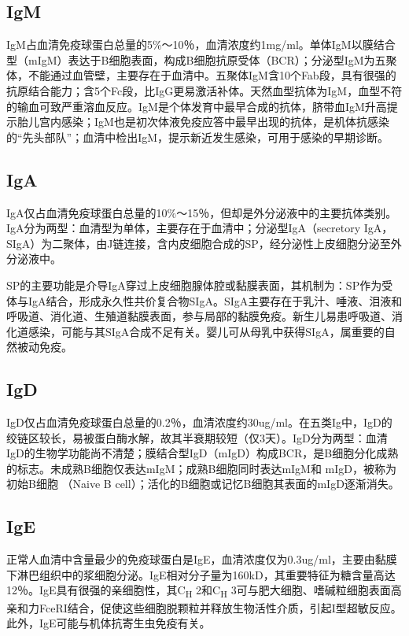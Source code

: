 \subsection{IgM}

IgM占血清免疫球蛋白总量的5\%～10％，血清浓度约1mg/ml。单体IgM以膜结合型（mIgM）表达于B细胞表面，构成B细胞抗原受体（BCR）；分泌型IgM为五聚体，不能通过血管壁，主要存在于血清中。五聚体IgM含10个Fab段，具有很强的抗原结合能力；含5个Fc段，比IgG更易激活补体。天然血型抗体为IgM，血型不符的输血可致严重溶血反应。IgM是个体发育中最早合成的抗体，脐带血IgM升高提示胎儿宫内感染；IgM也是初次体液免疫应答中最早出现的抗体，是机体抗感染的“先头部队”；血清中检出IgM，提示新近发生感染，可用于感染的早期诊断。


\subsection{IgA}

IgA仅占血清免疫球蛋白总量的10\%～15％，但却是外分泌液中的主要抗体类别。IgA分为两型：血清型为单体，主要存在于血清中；分泌型IgA（secretory
IgA，SIgA）为二聚体，由J链连接，含内皮细胞合成的SP，经分泌性上皮细胞分泌至外分泌液中。

SP的主要功能是介导IgA穿过上皮细胞腺体腔或黏膜表面，其机制为：SP作为受体与IgA结合，形成永久性共价复合物SIgA。SIgA主要存在于乳汁、唾液、泪液和呼吸道、消化道、生殖道黏膜表面，参与局部的黏膜免疫。新生儿易患呼吸道、消化道感染，可能与其SIgA合成不足有关。婴儿可从母乳中获得SIgA，属重要的自然被动免疫。


\subsection{IgD}

IgD仅占血清免疫球蛋白总量的0.2％，血清浓度约30ug/ml。在五类Ig中，IgD的绞链区较长，易被蛋白酶水解，故其半衰期较短（仅3天）。IgD分为两型：血清IgD的生物学功能尚不清楚；膜结合型IgD（mIgD）构成BCR，是B细胞分化成熟的标志。未成熟B细胞仅表达mIgM；成熟B细胞同时表达mIgM和
mIgD，被称为初始B细胞 （Naive B
cell）；活化的B细胞或记忆B细胞其表面的mIgD逐渐消失。


\subsection{IgE}

正常人血清中含量最少的免疫球蛋白是IgE，血清浓度仅为0.3ug/ml，主要由黏膜下淋巴组织中的浆细胞分泌。IgE相对分子量为160kD，其重要特征为糖含量高达12％。IgE具有很强的亲细胞性，其C\textsubscript{H}
2和C\textsubscript{H}
3可与肥大细胞、嗜碱粒细胞表面高亲和力FceRI结合，促使这些细胞脱颗粒并释放生物活性介质，引起I型超敏反应。此外，IgE可能与机体抗寄生虫免疫有关。

